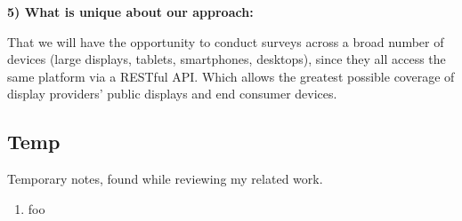 	\textbf{5) What is unique about our approach:}

		That we will have the opportunity to conduct surveys across a broad number of devices (large displays, tablets, smartphones, desktops), since they all access the same platform via a RESTful API. Which allows the greatest possible coverage of display providers' public displays and end consumer devices.







\subsection{Temp}

	Temporary notes, found while reviewing my related work.


	\begin{enumerate}
	\item foo
	\end{enumerate}
